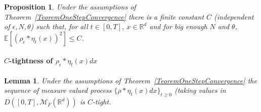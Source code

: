 \documentclass[12pt]{article}
\newtheorem{lemma}[theorem]{Lemma}
\newtheorem{proposition}[theorem]{Proposition}
\newcommand{\IE}{\mathbb E}
\newcommand{\IR}{\mathbb R}
\begin{document}
\begin{proposition}
Under the assumptions of Theorem~\ref{TeoremOneStepConvergence} there is a finite constant $C$ (independent of $\epsilon, N, \theta$) such that, for all $t \in [0,T]$, $x \in \IR^d$ and for big enough $N$ and $\theta$, $\IE[ (\rho_\epsilon*\eta_t(x))^2] \leq C$.\label{Prop:SecondMomentDensity}
\end{proposition} 


\paragraph{$C$-tightness of $\rho_\epsilon * \eta_t(x) dx$ }
\begin{lemma}
Under the assumptions of Theorem~\ref{TeoremOneStepConvergence} the sequence of measure valued process $\{ \rho*\eta_t(x) dx \}_{t \geq 0}$ (taking values in $D([0,T], \mathcal{M}_F(\IR^d))$ is $C$-tight.
\end{lemma}
\end{document}

